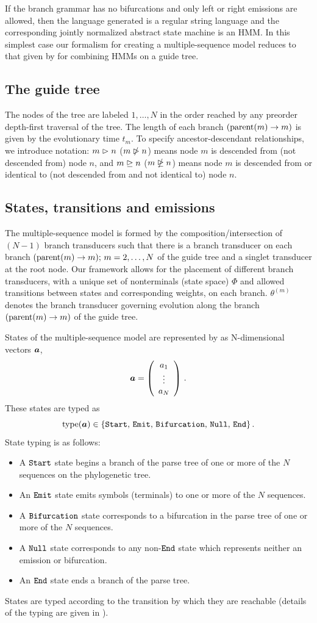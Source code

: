\documentclass[10pt]{article}
\begin{document}
If the branch grammar has no bifurcations and only left or right emissions are allowed, then
the language generated is a regular string language and the corresponding jointly normalized abstract state machine is 
an HMM.  In this simplest case our formalism for creating a multiple-sequence model reduces to that given 
by \cite{Holmes2003} for combining HMMs on a guide tree.


\subsection{The guide tree}
The nodes of the tree are labeled $1,\dots,N$ in the order reached by any preorder depth-first traversal of the tree.
The length of each branch $(\operatorname{parent}(m) \to m)$ is given by the evolutionary time $t_m$.
To specify ancestor-descendant relationships, we introduce notation:
$m \vartriangleright n$ ($m \ntriangleright n$) means node $m$ is descended from (not descended from) node $n$, and
$m \trianglerighteq n$ ($m \ntrianglerighteq n$) means node $m$ is descended from or identical to (not descended from and not identical to) node $n$.

\subsection{States, transitions and emissions}
The multiple-sequence model is formed by the composition/intersection of $(N-1)$ branch transducers 
such that there is a branch transducer on each branch $(\operatorname{parent}(m) \to m);\, m = 2,\dots,N$ of the guide tree and a singlet transducer at the root node.
Our framework allows for the placement of different branch transducers, with a unique set of nonterminals (state space) $\Phi$ and
allowed transitions between states and corresponding weights, on each branch.  $\theta^{(m)}$ denotes 
the branch transducer governing evolution along the branch $(\operatorname{parent}(m) \to m)$ of the guide tree.

States of the multiple-sequence model are represented by as N-dimensional vectors $\boldsymbol{a}$,
\[ \boldsymbol{a} = \left(\begin{array}{c}a_1\\\vdots\\a_N\end{array}\right) \, . \]
These states are typed as
\[ \operatorname{type}(\boldsymbol{a}) \in \lbrace\mathtt{Start},\,\mathtt{Emit},\,\mathtt{Bifurcation},\,\mathtt{Null},\,\mathtt{End}\rbrace \, . \]
State typing is as follows:
\begin{itemize}
  \item A $\mathtt{Start}$ state begins a branch of the parse tree of one or more of the $N$ sequences on the phylogenetic tree.
  \item An $\mathtt{Emit}$ state emits symbols (terminals) to one or more of the $N$ sequences.
  \item A $\mathtt{Bifurcation}$ state corresponds to a bifurcation in the parse tree of
    one or more of the $N$ sequences.
  \item A $\mathtt{Null}$ state corresponds to any non-$\mathtt{End}$ state which represents neither
    an emission or bifurcation.
  \item An $\mathtt{End}$ state ends a branch of the parse tree.
\end{itemize}
States are typed according to the transition by which they are reachable
(details of the typing are given in ).
\end{document}
